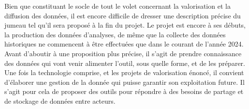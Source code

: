 Bien que constituant le socle de tout le volet concernant la valorisation et la diffusion des données, il est encore difficile de dresser une description précise du jumeau tel qu'il sera proposé à la fin du projet. Le projet est encore à ses débuts, la production des données d’analyses, de même que la collecte des données historiques ne commencent à être effectuées que dans le courant de l’année 2024. Avant d’aboutir à une proposition plus précise, il s’agit de prendre connaissance des données qui vont venir alimenter l’outil, sous quelle forme, et de les préparer.\\

Une fois la technologie comprise, et les projets de valorisation énoncé, il convient d'élaborer une gestion de la donnée qui puisse garantir son exploitation future. Il s’agit pour cela de proposer des outils pour répondre à des besoins de partage et de stockage de données entre acteurs.\\